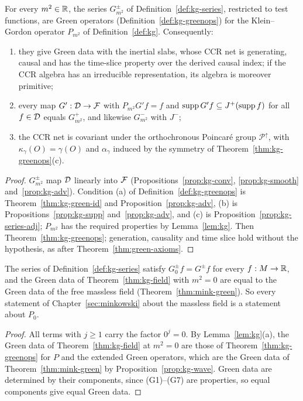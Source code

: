 \begin{theorem}\label{thm:kg-field}
For every $m^2\in\mathbb R$, the series $G^\pm_{m^2}$ of Definition~\ref{def:kg-series}, restricted to test
functions, are Green operators (Definition~\ref{def:kg-greenops}) for the Klein--Gordon operator
$P_{m^2}$ of Definition~\ref{def:kg}. Consequently:
\begin{enumerate}[label=(\alph*),leftmargin=2.5em]
\item they give Green data with the inertial slabs, whose CCR net is generating, causal and has the
time-slice property over the derived causal index; if the CCR algebra has an irreducible
representation, its algebra is moreover primitive;
\item every map $G':\mathcal D\to\mathcal F$ with $P_{m^2}G'f=f$ and $\operatorname{supp} G'f\subseteq J^+(\operatorname{supp} f)$ for all
$f\in\mathcal D$ equals $G^+_{m^2}$, and likewise $G^-_{m^2}$ with $J^-$;
\item the CCR net is covariant under the orthochronous Poincar\'e group $\mathcal P^\uparrow$, with
$\kappa_\gamma(O)=\gamma(O)$ and $\alpha_\gamma$ induced by the symmetry of
Theorem~\ref{thm:kg-greenops}(c).
\end{enumerate}
\end{theorem}
\begin{proof}
$G^\pm_{m^2}$ map $\mathcal D$ linearly into $\mathcal F$ (Propositions~\ref{prop:kg-conv}, \ref{prop:kg-smooth}
and~\ref{prop:kg-adv}). Condition (a) of Definition~\ref{def:kg-greenops} is
Theorem~\ref{thm:kg-green-id} and Proposition~\ref{prop:kg-adv}, (b) is
Propositions~\ref{prop:kg-supp} and~\ref{prop:kg-adv}, and (c) is
Proposition~\ref{prop:kg-series-adj}; $P_{m^2}$ has the required properties by Lemma~\ref{lem:kg}.
Then Theorem~\ref{thm:kg-greenops}; generation, causality and time slice hold without the hypothesis,
as after Theorem~\ref{thm:green-axioms}.
\end{proof}
\noindent{}

\begin{corollary}[The massless field is the case $m^2=0$]\label{cor:kg-zero}
The series of Definition~\ref{def:kg-series} satisfy $G^\pm_0f=G^\pm f$ for every $f:M\to\mathbb R$, and the
Green data of Theorem~\ref{thm:kg-field} with $m^2=0$ are equal to the Green data of the free massless
field (Theorem~\ref{thm:mink-green}). So every statement of Chapter~\ref{sec:minkowski} about the
massless field is a statement about $P_0$.
\end{corollary}
\begin{proof}
All terms with $j\ge1$ carry the factor $0^j=0$. By Lemma~\ref{lem:kg}(a), the Green data of
Theorem~\ref{thm:kg-field} at $m^2=0$ are those of Theorem~\ref{thm:kg-greenops} for $P$ and the
extended Green operators, which are the Green data of Theorem~\ref{thm:mink-green} by
Proposition~\ref{prop:kg-wave}. Green data are determined by their components, since (G1)--(G7) are properties, so equal
components give equal Green data.
\end{proof}

